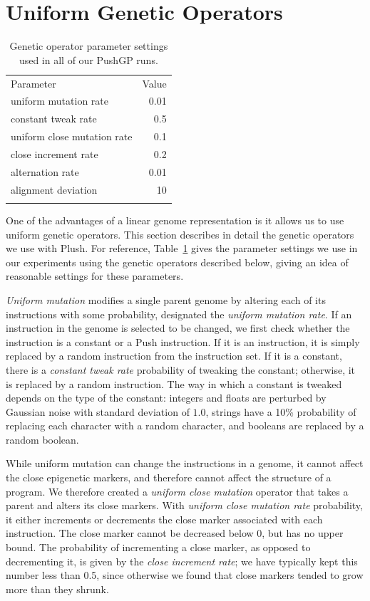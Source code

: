 \documentclass[graybox]{svmult}
\begin{document}
\section{Uniform Genetic Operators}
\label{section:genetic-operators}

\begin{table}[t]
\centering
\caption{Genetic operator parameter settings used in all of our PushGP runs.}
\label{tableGPconstantParams}
\begin{tabular}{l r}
\hline\noalign{\smallskip}
Parameter & Value \tabularnewline
\noalign{\smallskip}\svhline\noalign{\smallskip}
uniform mutation rate & 0.01 \tabularnewline
constant tweak rate & 0.5 \\
uniform close mutation rate & 0.1 \tabularnewline
close increment rate & 0.2 \\
alternation rate & 0.01 \tabularnewline
alignment deviation & 10 \tabularnewline
\noalign{\smallskip}\hline\noalign{\smallskip}
\end{tabular}
\end{table}

One of the advantages of a linear genome representation is it allows us to use uniform genetic operators. This section describes in detail the genetic operators we use with Plush. For reference, Table~\ref{tableGPconstantParams} gives the parameter settings we use in our experiments using the genetic operators described below, giving an idea of reasonable settings for these parameters.

\textit{Uniform mutation} modifies a single parent genome by altering each of its instructions with some probability, designated the \textit{uniform mutation rate}. If an instruction in the genome is selected to be changed, we first check whether the instruction is a constant or a Push instruction. If it is an instruction, it is simply replaced by a random instruction from the instruction set. If it is a constant, there is a \textit{constant tweak rate} probability of tweaking the constant; otherwise, it is replaced by a random instruction. The way in which a constant is tweaked depends on the type of the constant: integers and floats are perturbed by Gaussian noise with standard deviation of $1.0$, strings have a 10\% probability of replacing each character with a random character, and booleans are replaced by a random boolean.

While uniform mutation can change the instructions in a genome, it cannot affect the close epigenetic markers, and therefore cannot affect the structure of a program. We therefore created a \textit{uniform close mutation} operator that takes a parent and alters its close markers. With \textit{uniform close mutation rate} probability, it either increments or decrements the close marker associated with each instruction. The close marker cannot be decreased below 0, but has no upper bound. The probability of incrementing a close marker, as opposed to decrementing it, is given by the \textit{close increment rate}; we have typically kept this number less than 0.5, since otherwise we found that close markers tended to grow more than they shrunk.
\end{document}
